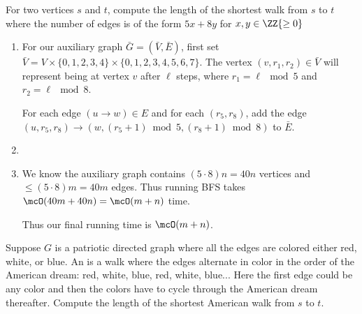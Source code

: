 \documentclass{article}
\begin{document}
\begin{subexercise} %
  For two vertices \( s \) and \( t \), compute the length of the shortest walk from \( s \) to \( t \) where the number of edges is of the form \( 5x+8y \) for \( x,y\in \ZZ{\geq 0} \)
\end{subexercise}

\begin{solution}

\begin{enumerate}[label=(\alph*)]
  \item For our auxiliary graph \( \bar G=(\bar V,\bar E) \), first set \( \bar V =V\times\{0,1,2,3,4\}\times\{0,1,2,3,4,5,6,7\} \).
  The vertex \( (v,r_1,r_2)\in\bar V \) will represent being at vertex \( v \) after \( \ell \) steps, where \( r_1=\ell\mod 5 \) and \( r_2=\ell\mod 8 \).

	For each edge \( (u \to w)\in E \) and for each \( (r_5,r_8) \), add the edge \( (u, r_5, r_8)\to(w, (r_5+1)\bmod 5, (r_8+1)\bmod 8) \) to \( \bar E \).
  \item {}

  \item We know the auxiliary graph contains \( (5\cdot 8) n = 40n \) vertices and \( \leq (5\cdot 8) m = 40m \) edges. Thus running BFS takes \( \mcO(40m+40n) = \mcO(m+n) \) time.

  Thus our final running time is \( \mcO(m+n) \).
\end{enumerate}
\end{solution}
\pagebreak

\begin{subexercise} %
  Suppose \( G \) is a patriotic directed graph where all the edges are colored either red, white, or blue.
  An  is a walk where the edges alternate in color in the order of the American dream: red, white, blue, red, white, blue...
  Here the first edge could be any color and then the colors have to cycle through the American dream thereafter.
  Compute the length of the shortest American walk from \( s \) to \( t \).
\end{subexercise}
\end{document}
